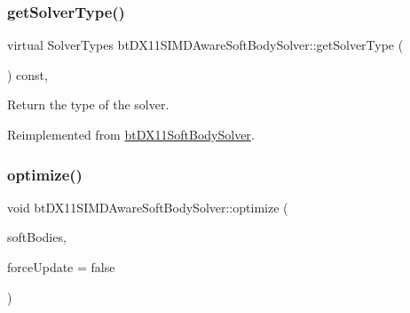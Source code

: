 \mbox{\label{classbtDX11SIMDAwareSoftBodySolver_ad36369c7c58e1cb8ddea7ebd54612eb9}} 
\subsubsection{\texorpdfstring{get\+Solver\+Type()}{getSolverType()}\hspace{0.1cm}{\footnotesize\ttfamily [2/2]}}
{\footnotesize\ttfamily virtual Solver\+Types bt\+D\+X11\+S\+I\+M\+D\+Aware\+Soft\+Body\+Solver\+::get\+Solver\+Type (\begin{DoxyParamCaption}{ }\end{DoxyParamCaption}) const\hspace{0.3cm}{\ttfamily [inline]}, {\ttfamily [virtual]}}

Return the type of the solver. 

Reimplemented from \hyperlink{classbtDX11SoftBodySolver_a1142bb4f735d275f161f003f7d703768}{bt\+D\+X11\+Soft\+Body\+Solver}.

\mbox{\label{classbtDX11SIMDAwareSoftBodySolver_a575cf63485ef6a9a55f045e13dcb7717}} 
\subsubsection{\texorpdfstring{optimize()}{optimize()}\hspace{0.1cm}{\footnotesize\ttfamily [1/2]}}
{\footnotesize\ttfamily void bt\+D\+X11\+S\+I\+M\+D\+Aware\+Soft\+Body\+Solver\+::optimize (\begin{DoxyParamCaption}\item[{\hyperlink{classbtAlignedObjectArray}{bt\+Aligned\+Object\+Array}$<$ \hyperlink{classbtSoftBody}{bt\+Soft\+Body} $\ast$ $>$ \&}]{soft\+Bodies,  }\item[{bool}]{force\+Update = {\ttfamily false} }\end{DoxyParamCaption})\hspace{0.3cm}{\ttfamily [virtual]}}


